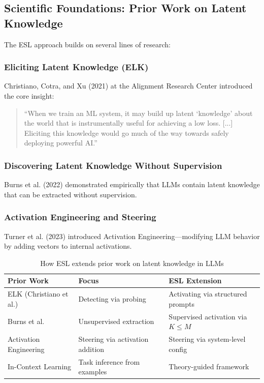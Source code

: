 \documentclass[11pt,a4paper]{article}
\begin{document}
\subsection{Scientific Foundations: Prior Work on Latent Knowledge}

The ESL approach builds on several lines of research:

\subsubsection{Eliciting Latent Knowledge (ELK)}
Christiano, Cotra, and Xu (2021) at the Alignment Research Center introduced the core insight:
\begin{quote}
``When we train an ML system, it may build up latent `knowledge' about the world that is instrumentally useful for achieving a low loss. [...] Eliciting this knowledge would go much of the way towards safely deploying powerful AI.''
\end{quote}

\subsubsection{Discovering Latent Knowledge Without Supervision}
Burns et al. (2022) demonstrated empirically that LLMs contain latent knowledge that can be extracted without supervision.

\subsubsection{Activation Engineering and Steering}
Turner et al. (2023) introduced Activation Engineering---modifying LLM behavior by adding vectors to internal activations.

\begin{table}[H]
\centering
\caption{How ESL extends prior work on latent knowledge in LLMs}
\begin{tabular}{lll}
\toprule
\textbf{Prior Work} & \textbf{Focus} & \textbf{ESL Extension} \\
\midrule
ELK (Christiano et al.) & Detecting via probing & Activating via structured prompts \\
Burns et al. & Unsupervised extraction & Supervised activation via $K \leq M$ \\
Activation Engineering & Steering via activation addition & Steering via system-level config \\
In-Context Learning & Task inference from examples & Theory-guided framework \\
\bottomrule
\end{tabular}
\end{table}
\end{document}
